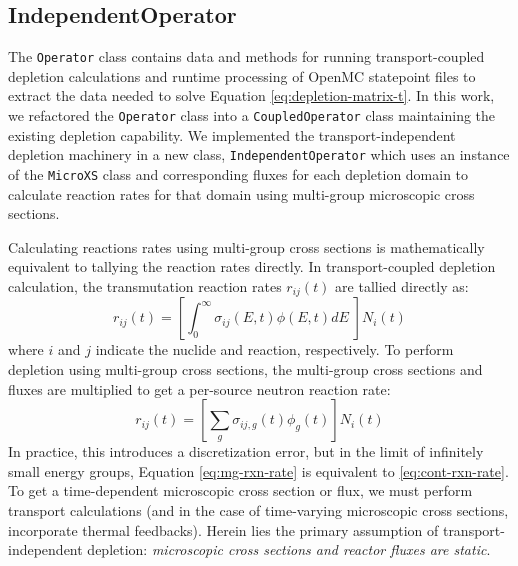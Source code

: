     \subsection{IndependentOperator}
        The \verb.Operator. class contains data and methods for running
        transport-coupled depletion calculations and runtime processing of
        OpenMC statepoint files to extract the data needed to solve Equation
        \ref{eq:depletion-matrix-t}. In this work, we refactored the
        \verb.Operator. class into a \verb.CoupledOperator.  class maintaining
        the existing depletion capability. We implemented the
        transport-independent depletion machinery in a new class,
        \verb.IndependentOperator. which uses an instance of the \verb.MicroXS.
        class and corresponding fluxes for each depletion domain to calculate
        reaction rates for that domain using multi-group microscopic cross
        sections.

        Calculating reactions rates using multi-group cross sections is
        mathematically equivalent to tallying the reaction rates directly. In
        transport-coupled depletion calculation, the transmutation reaction
        rates $r_{ij}(t)$ are tallied directly as:
        \begin{equation}
            \label{eq:cont-rxn-rate}
            r_{ij}(t) = \left[\int_0^\infty \sigma_{ij}(E,t) \phi(E,t) dE \; \right]
            N_{i}(t)
        \end{equation}
        where $i$ and $j$ indicate the nuclide and reaction, respectively.
            To perform depletion using multi-group cross sections, the multi-group
        cross sections and fluxes are multiplied to get a per-source neutron
        reaction rate:
        \begin{equation}
            \label{eq:mg-rxn-rate}
            r_{ij}(t) = \left[\sum_{g} \sigma_{ij,g}(t) \phi_{g}(t) \right]
            N_{i}(t) 
        \end{equation}
        In practice, this introduces a discretization error, but in the limit of
        infinitely small energy groups, Equation \ref{eq:mg-rxn-rate} is
        equivalent to \ref{eq:cont-rxn-rate}. To get a time-dependent
        microscopic cross section or flux, we must perform transport
        calculations (and in the case of time-varying microscopic cross
        sections, incorporate thermal feedbacks). Herein lies the primary
        assumption of transport-independent depletion: {\it microscopic cross
        sections and reactor fluxes are static}.

